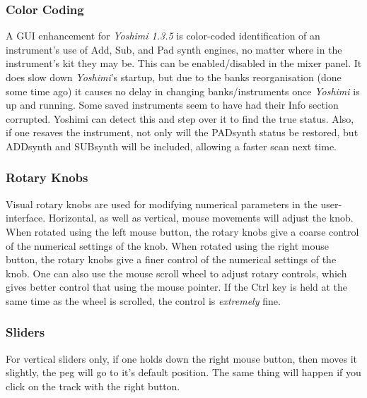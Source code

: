 \subsubsection{Color Coding}
\label{subsubsec:stock_settings_elements_color_coding}

   A GUI enhancement for \textsl{Yoshimi 1.3.5} is color-coded
   identification of an instrument's use of Add, Sub, and Pad synth engines,
   no matter where in the instrument's kit they may be. This can be
   enabled/disabled in the mixer panel. It does slow down
   \textsl{Yoshimi}'s startup,
   but due to the banks reorganisation (done some time ago) it causes no
   delay in changing banks/instruments once \textsl{Yoshimi} is
   up and running.  Some
   saved instruments seem to have had their Info section corrupted. Yoshimi
   can detect this and step over it to find the true status. Also, if one
   resaves the instrument, not only will the PADsynth status be restored, but
   ADDsynth and SUBsynth will be included, allowing a faster scan next time.

\subsubsection{Rotary Knobs}
\label{subsubsec:stock_settings_elements_knobs}

   Visual rotary knobs are used for modifying numerical parameters in the
   user-interface.
   Horizontal, as well as vertical, mouse movements will adjust the knob.
   When rotated using the left mouse button, the rotary knobs give a coarse
   control of the numerical settings of the knob.
   When rotated using the right mouse button, the rotary knobs give a finer
   control of the numerical settings of the knob.
   One can also use the mouse scroll wheel to adjust rotary controls, which
   gives better control that using the mouse pointer.
   If the Ctrl key is held at the same time as the wheel is scrolled, the
   control is \textsl{extremely} fine.

\subsubsection{Sliders}
\label{subsubsec:stock_settings_elements_sliders}

   For vertical sliders only, if one holds down the right mouse button, then
   moves it slightly, the peg will go to it's default position. The same
   thing will happen if you click on the track with the right button.

